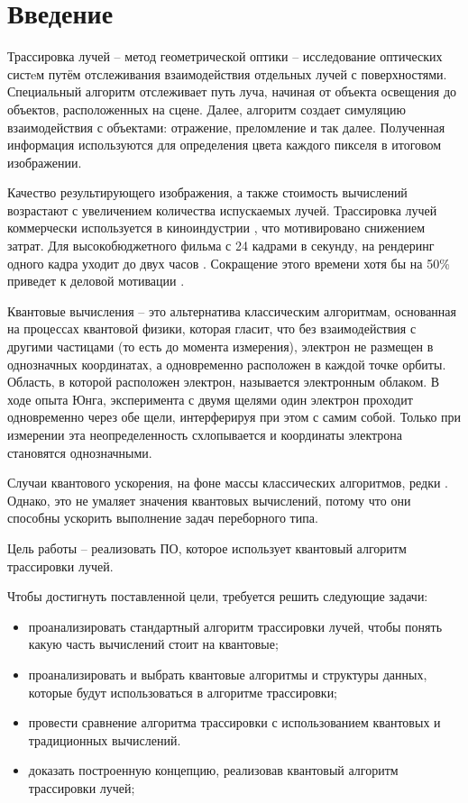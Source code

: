 \chapter*{Введение}

Трассировка лучей -- метод геометрической оптики -- исследование оптических систeм путём отслеживания взаимодействия отдельных лучей с поверхностями. Специальный алгоритм отслеживает путь луча, начиная от объекта освещения до объектов, расположенных на сцене. Далее, алгоритм создает симуляцию взаимодействия с объектами: отражение, преломление и так далее. Полученная информация используются для определения цвета каждого пикселя в итоговом изображении. 

Качество результирующего изображения, а также стоимость вычислений возрастают с увеличением количества испускаемых лучей. Трассировка лучей коммерчески используется в киноиндустрии \cite{path-traced-movies}, что мотивировано снижением затрат. Для высокобюджетного фильма с 24 кадрами в секунду, на рендеринг одного кадра уходит до двух часов \cite{path-traced-movies}. Сокращение этого времени хотя бы на 50\% приведет к деловой мотивации \cite{path-traced-movies}. 

Квантовые вычисления -- это альтернатива классическим алгоритмам, основанная на процессах квантовой физики, которая гласит, что без взаимодействия с другими частицами (то есть до момента измерения), электрон не
размещен в однозначных координатах, а одновременно расположен
в каждой точке орбиты. Область, в которой расположен электрон, называется электронным облаком. В ходе опыта Юнга, эксперимента с двумя щелями один электрон проходит одновременно через обе щели, интерферируя при этом с самим собой. Только при измерении эта неопределенность схлопывается и координаты электрона становятся однозначными.

Случаи квантового ускорения, на фоне массы классических алгоритмов, редки \cite{quantum-computers-speed-up}. Однако, это не умаляет значения квантовых вычислений, потому что они способны ускорить выполнение задач переборного типа. 

Цель работы -- реализовать ПО, которое
использует квантовый алгоритм трассировки лучей.

Чтобы достигнуть поставленной цели, требуется решить следующие задачи:

\begin{itemize}
    \item проанализировать стандартный алгоритм трассировки лучей, чтобы
понять какую часть вычислений стоит на квантовые;
    \item проанализировать и выбрать квантовые алгоритмы и структуры данных, которые будут использоваться в алгоритме трассировки;
    \item провести сравнение алгоритма трассировки с использованием квантовых и традиционных вычислений.
    \item доказать построенную концепцию, реализовав квантовый алгоритм трассировки лучей;
\end{itemize}
